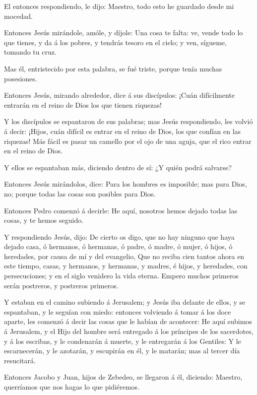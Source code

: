  El entonces respondiendo, le dijo: Maestro, todo esto he
guardado desde mi mocedad.

 Entonces Jesús mirándole, amóle, y díjole: Una cosa te
falta: ve, vende todo lo que tienes, y da á los pobres, y tendrás tesoro
en el cielo; y ven, sígueme, tomando tu cruz.

 Mas él, entristecido por esta palabra, se fué triste,
porque tenía muchas posesiones.

 Entonces Jesús, mirando alrededor, dice á sus discípulos:
¡Cuán difícilmente entrarán en el reino de Dios los que tienen riquezas!

 Y los discípulos se espantaron de sus palabras; mas Jesús
respondiendo, les volvió á decir: ¡Hijos, cuán difícil es entrar en el
reino de Dios, los que confían en las riquezas!  Más fácil
es pasar un camello por el ojo de una aguja, que el rico entrar en el
reino de Dios.

 Y ellos se espantaban más, diciendo dentro de sí: ¿Y quién
podrá salvarse?

 Entonces Jesús mirándolos, dice: Para los hombres es
imposible; mas para Dios, no; porque todas las cosas son posibles para
Dios.

 Entonces Pedro comenzó á decirle: He aquí, nosotros hemos
dejado todas las cosas, y te hemos seguido.

 Y respondiendo Jesús, dijo: De cierto os digo, que no hay
ninguno que haya dejado casa, ó hermanos, ó hermanas, ó padre, ó madre,
ó mujer, ó hijos, ó heredades, por causa de mí y del evangelio,
 Que no reciba cien tantos ahora en este tiempo, casas, y
hermanos, y hermanas, y madres, é hijos, y heredades, con persecuciones;
y en el siglo venidero la vida eterna.  Empero muchos
primeros serán postreros, y postreros primeros.

 Y estaban en el camino subiendo á Jerusalem; y Jesús iba
delante de ellos, y se espantaban, y le seguían con miedo: entonces
volviendo á tomar á los doce aparte, les comenzó á decir las cosas que
le habían de acontecer:  He aquí subimos á Jerusalem, y el
Hijo del hombre será entregado á los príncipes de los sacerdotes, y á
los escribas, y le condenarán á muerte, y le entregarán á los Gentiles:
 Y le escarnecerán, y le azotarán, y escupirán en él, y le
matarán; mas al tercer día resucitará.

 Entonces Jacobo y Juan, hijos de Zebedeo, se llegaron á
él, diciendo: Maestro, querríamos que nos hagas lo que pidiéremos.

